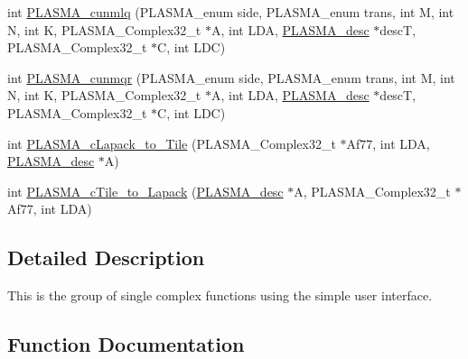 \begin{DoxyCompactItemize}
\item 
int \hyperlink{group__PLASMA__Complex32__t_gac9aca2d8444a6e5630fe4674505a2afd_gac9aca2d8444a6e5630fe4674505a2afd}{P\+L\+A\+S\+M\+A\+\_\+cunmlq} (P\+L\+A\+S\+M\+A\+\_\+enum side, P\+L\+A\+S\+M\+A\+\_\+enum trans, int M, int N, int K, P\+L\+A\+S\+M\+A\+\_\+\+Complex32\+\_\+t $\ast$A, int L\+D\+A, \hyperlink{structplasma__desc__t}{P\+L\+A\+S\+M\+A\+\_\+desc} $\ast$desc\+T, P\+L\+A\+S\+M\+A\+\_\+\+Complex32\+\_\+t $\ast$C, int L\+D\+C)
\item 
int \hyperlink{group__PLASMA__Complex32__t_gac4f6c16a5e7d9bc92ec6addcaa42bad1_gac4f6c16a5e7d9bc92ec6addcaa42bad1}{P\+L\+A\+S\+M\+A\+\_\+cunmqr} (P\+L\+A\+S\+M\+A\+\_\+enum side, P\+L\+A\+S\+M\+A\+\_\+enum trans, int M, int N, int K, P\+L\+A\+S\+M\+A\+\_\+\+Complex32\+\_\+t $\ast$A, int L\+D\+A, \hyperlink{structplasma__desc__t}{P\+L\+A\+S\+M\+A\+\_\+desc} $\ast$desc\+T, P\+L\+A\+S\+M\+A\+\_\+\+Complex32\+\_\+t $\ast$C, int L\+D\+C)
\item 
int \hyperlink{group__PLASMA__Complex32__t_ga44c99c1388a7830a6efbc4fc1ab328f3_ga44c99c1388a7830a6efbc4fc1ab328f3}{P\+L\+A\+S\+M\+A\+\_\+c\+Lapack\+\_\+to\+\_\+\+Tile} (P\+L\+A\+S\+M\+A\+\_\+\+Complex32\+\_\+t $\ast$Af77, int L\+D\+A, \hyperlink{structplasma__desc__t}{P\+L\+A\+S\+M\+A\+\_\+desc} $\ast$A)
\item 
int \hyperlink{group__PLASMA__Complex32__t_ga7dce142b920d792a0443efcc922c71fc_ga7dce142b920d792a0443efcc922c71fc}{P\+L\+A\+S\+M\+A\+\_\+c\+Tile\+\_\+to\+\_\+\+Lapack} (\hyperlink{structplasma__desc__t}{P\+L\+A\+S\+M\+A\+\_\+desc} $\ast$A, P\+L\+A\+S\+M\+A\+\_\+\+Complex32\+\_\+t $\ast$Af77, int L\+D\+A)
\end{DoxyCompactItemize}


\subsection{Detailed Description}
This is the group of single complex functions using the simple user interface. 

\subsection{Function Documentation}
\hypertarget{group__PLASMA__Complex32__t_gabe6af489e627824777d1428f1ab586c0_gabe6af489e627824777d1428f1ab586c0}{}

